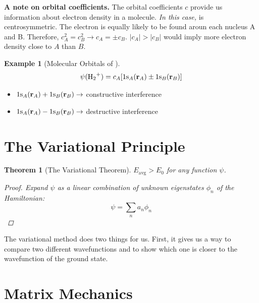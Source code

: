 \documentclass[a4paper]{tufte-handout}
\newtheorem{theorem}{Theorem}
\theoremstyle{definition}
\newtheorem{example}{Example}
\begin{document}
\textbf{A note on orbital coefficients.} The orbital coefficients $c$ provide us information
about electron density in a molecule. \textit{In this case,}  is centrosymmetric. 
The electron is equally likely to be found aroun each nucleus A and B. Therefore, $c_A^2 = c_B^2 \rightarrow c_A = \pm c_B$.
$|c_A| > |c_B|$ would imply more electron density close
to $A$ than $B$.

\begin{example}[Molecular Orbitals of ]

  \begin{equation}
    \psi(\ce{H2+}) = c_A[1\ce{s_}_A (\mathbf{r}_A) \pm 1\ce{s_}_B (\mathbf{r}_B)]
  \end{equation}

\begin{itemize}
  \item $1\ce{s_}_A (\mathbf{r}_A) + 1\ce{s_}_B (\mathbf{r}_B) \rightarrow$ constructive interference
  \item $1\ce{s_}_A (\mathbf{r}_A) - 1\ce{s_}_B (\mathbf{r}_B) \rightarrow$ destructive interference
\end{itemize}

\end{example}

\section{The Variational Principle}

\begin{theorem}[The Variational Theorem] $E_{\mathrm{avg}} > E_0$ for any function $\psi$. 

  \begin{proof}
    Expand $\psi$ as a linear combination of unknown eigenstates $\phi_n$ of the Hamiltonian:
    \begin{equation*}
      \psi = \sum_n a_n \phi_n
    \end{equation*}
  \end{proof}
  
\end{theorem}

The variational method does two things for us. First, it gives us a way to compare two 
different wavefunctions and to show which one is closer to the wavefunction of the ground state. 

\section{Matrix Mechanics}
\end{document}
